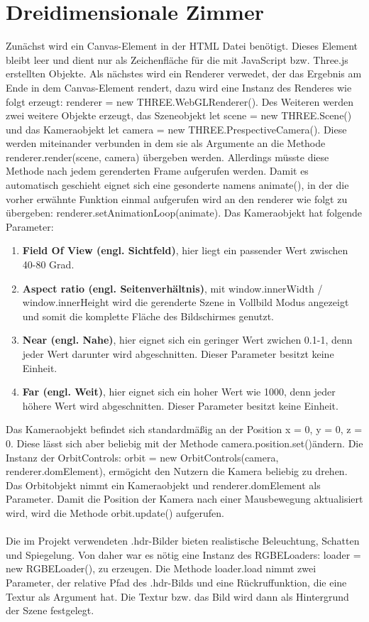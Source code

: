 \section{Dreidimensionale Zimmer}
Zunächst wird ein Canvas-Element in der HTML Datei benötigt. Dieses Element bleibt leer und dient nur als Zeichenfläche für die mit JavaScript bzw. Three.js erstellten Objekte. Als nächstes wird ein Renderer verwedet, der das Ergebnis am Ende in dem Canvas-Element rendert, dazu wird eine Instanz des Renderes wie folgt erzeugt: renderer = new THREE.WebGLRenderer(). Des Weiteren werden zwei weitere Objekte erzeugt, das Szeneobjekt let scene = new THREE.Scene() und das Kameraobjekt let camera = new THREE.PrespectiveCamera(). Diese werden miteinander verbunden in dem sie als Argumente an die Methode renderer.render(scene, camera) übergeben werden. Allerdings müsste diese Methode nach jedem gerenderten Frame aufgerufen werden. Damit es automatisch geschieht eignet sich eine gesonderte namens animate(), in der die vorher erwähnte Funktion einmal aufgerufen wird an den renderer wie folgt zu übergeben: renderer.setAnimationLoop(animate).
\newpage
Das Kameraobjekt hat folgende Parameter:
\begin{enumerate}
	\item \textbf{Field Of View (engl. Sichtfeld)}, hier liegt ein passender Wert zwischen 40-80 Grad.
	\item \textbf{Aspect ratio (engl. Seitenverhältnis)}, mit window.innerWidth / window.innerHeight wird die gerenderte Szene in Vollbild Modus angezeigt und somit die komplette Fläche des Bildschirmes genutzt.  
	\item \textbf{Near (engl. Nahe)}, hier eignet sich ein geringer Wert zwichen 0.1-1, denn jeder Wert darunter wird abgeschnitten. Dieser Parameter besitzt keine Einheit. 
	\item \textbf{Far (engl. Weit)}, hier eignet sich ein hoher Wert wie 1000, denn jeder höhere Wert wird abgeschnitten. Dieser Parameter besitzt keine Einheit.
\end{enumerate}
Das Kameraobjekt befindet sich standardmäßig an der Position x = 0, y = 0, z = 0. Diese lässt sich aber beliebig mit der Methode \glqq camera.position.set()\grqq \thickspace ändern. Die Instanz der OrbitControls: orbit = new OrbitControls(camera, renderer.domElement), ermögicht den Nutzern die Kamera beliebig zu drehen. Das Orbitobjekt nimmt ein Kameraobjekt und renderer.domElement als Parameter. Damit die Position der Kamera nach einer Mausbewegung aktualisiert wird, wird die Methode orbit.update() aufgerufen.
\\
\\
Die im Projekt verwendeten .hdr-Bilder bieten realistische Beleuchtung, Schatten und Spiegelung. Von daher war es nötig eine Instanz des RGBELoaders: loader = new RGBELoader(), zu erzeugen. Die Methode loader.load nimmt zwei Parameter, der relative Pfad des .hdr-Bilds und eine Rückruffunktion, die eine Textur als Argument hat. Die Textur bzw. das Bild wird dann als Hintergrund der Szene festgelegt.

